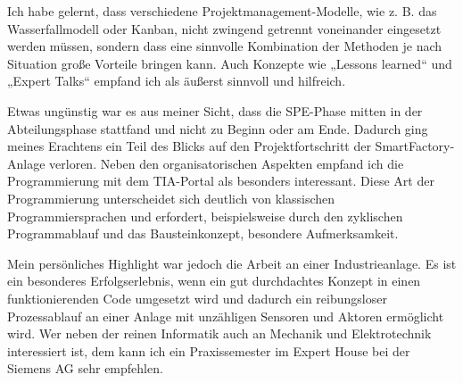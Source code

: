 Ich habe gelernt, dass verschiedene Projektmanagement-Modelle, wie z. B. das Wasserfallmodell oder Kanban, nicht zwingend getrennt voneinander eingesetzt werden 
müssen, sondern dass eine sinnvolle Kombination der Methoden je nach Situation große Vorteile bringen kann. Auch Konzepte wie „Lessons learned“ und „Expert Talks“
empfand ich als äußerst sinnvoll und hilfreich.

Etwas ungünstig war es aus meiner Sicht, dass die SPE-Phase mitten in der Abteilungsphase stattfand und nicht zu Beginn oder am Ende. Dadurch ging meines 
Erachtens ein Teil des Blicks auf den Projektfortschritt der SmartFactory-Anlage verloren. Neben den organisatorischen Aspekten empfand ich die Programmierung mit
dem TIA-Portal als besonders interessant. Diese Art der Programmierung unterscheidet sich deutlich von klassischen Programmiersprachen und erfordert, 
beispielsweise durch den zyklischen Programmablauf und das Bausteinkonzept, besondere Aufmerksamkeit.

Mein persönliches Highlight war jedoch die Arbeit an einer Industrieanlage. Es ist ein besonderes Erfolgserlebnis, wenn ein gut durchdachtes Konzept in einen 
funktionierenden Code umgesetzt wird und dadurch ein reibungsloser Prozessablauf an einer Anlage mit unzähligen Sensoren und Aktoren ermöglicht wird. Wer neben
der reinen Informatik auch an Mechanik und Elektrotechnik interessiert ist, dem kann ich ein Praxissemester im Expert House bei der Siemens AG sehr empfehlen.

